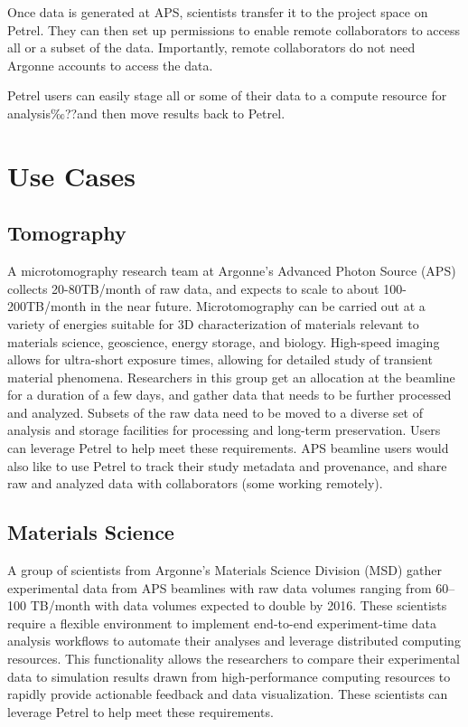 \documentclass[sigconf]{acmart}
\begin{document}
Once data is generated at APS, scientists transfer it to the project space on Petrel. They can then set up permissions to enable remote collaborators to access all or a subset of the data. Importantly, remote collaborators do not need Argonne accounts to access the data.

Petrel users can easily stage all or some of their data to a compute resource for analysis‰??and then move results back to Petrel.


\section{Use Cases}

\subsection{Tomography}

A microtomography research team at Argonne's Advanced Photon Source (APS) collects 20-80TB/month of raw data, and expects to scale to about 100-200TB/month in the near future. Microtomography can be carried out at a variety of energies suitable for 3D characterization of materials relevant to materials science, geoscience, energy storage, and biology. High-speed imaging allows for ultra-short exposure times, allowing for detailed study of transient material phenomena. Researchers in this group get an allocation at the beamline for a duration of a few days, and gather data that needs to be further processed and analyzed. Subsets of the raw data need to be moved to a diverse set of analysis and storage facilities for processing and long-term preservation. Users can leverage Petrel to help meet these requirements. APS beamline users would also like to use Petrel to track their study metadata and provenance, and share raw and analyzed data with collaborators (some working remotely).



\subsection{Materials Science}

A group of scientists from Argonne's Materials Science Division (MSD) gather experimental data from APS beamlines with raw data volumes ranging from 60--100 TB/month with data volumes expected to double by 2016. These scientists require a flexible environment to implement end-to-end experiment-time data analysis workflows to automate their analyses and leverage distributed computing resources. This functionality allows the researchers to compare their experimental data to simulation results drawn from high-performance computing resources to rapidly provide actionable feedback and data visualization. These scientists can leverage Petrel to help meet these requirements.
\end{document}
